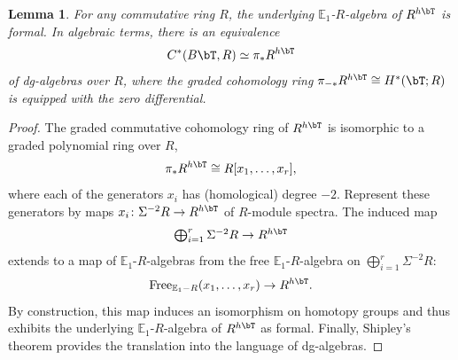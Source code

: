\documentclass{amsart}%
\numberwithin{equation}{section}%
\newtheorem{Lem}[subsection]{Lemma}
\theoremstyle{remark}
\begin{document}
\begin{Lem}\label{lem:formality}
For any commutative ring $R$, the underlying $\mathbb{E}_1$-$R$-algebra of $R^{h\bT}$ is formal. In algebraic terms, there is an equivalence 
\[
C^*(B\bT,R) \simeq \pi_{*}R^{h\bT}
\]
of dg-algebras over $R$, where the graded cohomology ring $\pi_{-*}R^{h\bT} \cong H^{*}(\bT;R)$ is equipped with the zero differential. 
\end{Lem}
\begin{proof}
The graded commutative cohomology ring of $R^{h\bT}$ is isomorphic to a graded polynomial ring over $R$,
\begin{equation}\label{eq:cohomologytorus}
\pi_*R^{h\bT} \cong R[x_1,\ldots,x_r],
\end{equation}
where each of the generators $x_i$ has (homological) degree $-2$. Represent these generators by maps $x_i\colon\Sigma^{-2}R \to R^{h\bT}$ of $R$-module spectra. The induced map 
\[
\textstyle\bigoplus_{i=1}^r\Sigma^{-2}R \to R^{h\bT}
\]
extends to a map of $\mathbb{E}_1$-$R$-algebras from the free $\mathbb{E}_1$-$R$-algebra on $\bigoplus_{i=1}^r\Sigma^{-2}R$:
\[
\mathrm{Free}_{\mathbb{E}_1-R}(x_1,\ldots,x_r) \to R^{h\bT}.
\]
By construction, this map induces an isomorphism on homotopy groups and thus exhibits the underlying $\mathbb{E}_1$-$R$-algebra of $R^{h\bT}$ as formal. Finally, Shipley's theorem \cite{shipley_hzalgebras} provides the translation into the language of dg-algebras. 
\end{proof}
\end{document}
